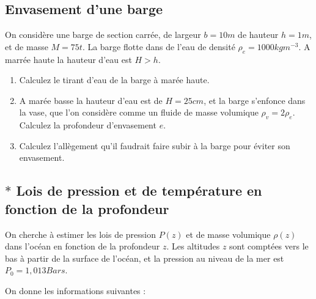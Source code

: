   
\subsection{Envasement d'une barge}


 
  
On considère une barge de section carrée, de largeur $b=10m$ de hauteur 
$h=1m$,  et de masse $M = 75 t$. 
La barge flotte dans de l'eau de densité $\rho_e=1000kg m^{-3}$.
A marrée haute la hauteur d'eau est $H > h$.
  
  
\begin{enumerate}

\item Calculez le tirant d'eau de la barge à marée haute.


\item A marée basse la hauteur d'eau est de $H =25cm$, et la barge
s'enfonce dans la vase, que l'on considère comme un fluide de masse volumique
$\rho_v = 2 \rho_e$.
Calculez la profondeur d'envasement $e$.

\item Calculez l'allègement qu'il faudrait faire subir à la barge pour éviter
son envasement.


\end{enumerate}  


\subsection{$*$ Lois de pression et de température en fonction de la profondeur}

On cherche à estimer les lois de pression $P(z)$ et de 
masse volumique $\rho(z)$ dans l'océan en fonction de la profondeur $z$.
Les altitudes $z$ sont comptées vers le bas à partir de la surface
de l'océan, et la pression au niveau de la mer est $P_0 = 1,013 Bars$.

On donne les informations suivantes :

